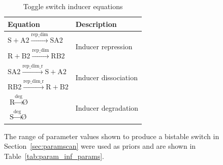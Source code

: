 \begin{table}[htbp]
\centering
\caption{Toggle switch inducer equations}
\label{tab:toglle-inducer-equs}
\begin{tabular}{@{}ll@{}}
\toprule
Equation                                                                                & Description                           \\ \midrule
$\textrm{S} + \textrm{A2} \stackrel{\textrm{rep\_dim}}{\longrightarrow}\textrm{SA2}$    & \multirow{2}{*}{Inducer repression}   \\
$\textrm{R} + \textrm{B2} \stackrel{\textrm{rep\_dim}}{\longrightarrow}\textrm{RB2}$    &                                       \\
$\textrm{SA2} \stackrel{\textrm{rep\_dim\_r}}{\longrightarrow}\textrm{S} + \textrm{A2}$ & \multirow{2}{*}{Inducer dissociation} \\
$\textrm{RB2} \stackrel{\textrm{rep\_dim\_r}}{\longrightarrow}\textrm{R} + \textrm{B2}$ &                                       \\
$\textrm{R} \stackrel{\textrm{deg}}{\longrightarrow} \textrm{\O}$                       & \multirow{2}{*}{Inducer degradation}  \\
$\textrm{S} \stackrel{\textrm{deg}}{\longrightarrow}\textrm{\O}$                        &                                       \\ \cmidrule(r){1-2}
\end{tabular}
\end{table}
The range of parameter values shown to produce a bistable switch in Section~\ref{sec:paramscan} were used as priors and are shown in Table~\ref{tab:param_inf_params}.

